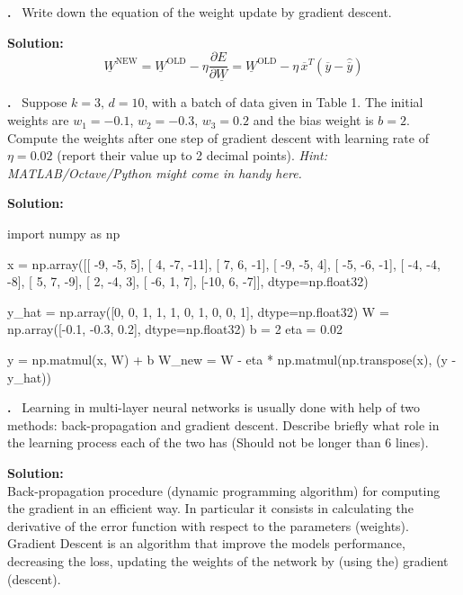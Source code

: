 \documentclass[12pt]{article}
\newcounter{problem}
\newcounter{solution}
\newcommand\Problem{%
	\stepcounter{problem}%
	\textbf{\theproblem.}~%
	\setcounter{solution}{0}%
}
\newcommand\Solution{%
	\textbf{Solution:}\\%
}
\begin{document}
\Problem{Write down the equation of the weight update by gradient descent.}

\Solution{	
	\begin{equation}
	\underline{W}^{\mathrm{NEW}}=\underline{W}^{\mathrm{OLD}}-\eta \frac{\partial E}{\partial \underline{W}}=\underline{W}^{\mathrm{OLD}}-\eta \, \overline{x}^T(\overline{y}-\hat{\overline{y}})
	\end{equation}
}

\Problem{Suppose $k = 3\mbox{, }d =10$, with a batch of data given in Table 1. The initial weights are $w_1 = -0.1$, $w_2 = -0.3$, $w_3 = 0.2$ and the bias weight is $b = 2$. Compute the weights after one step of gradient descent with learning rate of $\eta = 0.02$ (report their value up to 2 decimal points). \textit{Hint: MATLAB/Octave/Python might come in handy here.}}

\Solution{
	\begin{python}
		import numpy as np
				
		x = np.array([[ -9, -5,    5],
					   [   4, -7, -11],
					   [   7,   6,  -1],
					   [ -9, -5,    4],
					   [ -5, -6,  -1],
					   [ -4, -4,  -8],
					   [   5,   7,  -9],
					   [   2, -4,    3],
					   [ -6,   1,    7],
					   [-10,   6,  -7]],
					  dtype=np.float32)
		
		y_hat = np.array([0, 0, 1, 1, 1, 0, 1, 0, 0, 1], dtype=np.float32)
		W = np.array([-0.1, -0.3, 0.2], dtype=np.float32)
		b = 2
		eta = 0.02
		
		y = np.matmul(x, W) + b
		W_new = W - eta * np.matmul(np.transpose(x), (y - y_hat))
	\end{python}
	}

\Problem{Learning in multi-layer neural networks is usually done with help of two methods: back-propagation and gradient descent. Describe briefly what role in the learning process each of the two has (Should not be longer than $6$ lines).}

\Solution{Back-propagation  procedure (dynamic programming algorithm) for computing the gradient in an efficient way. In particular it consists in calculating the derivative of the error function with respect to the parameters (weights).\\
Gradient Descent is an algorithm that improve the models performance, decreasing the loss, updating the weights of the network by (using the) gradient (descent).}
\printbibliography
\nocite{*}
\end{document}
